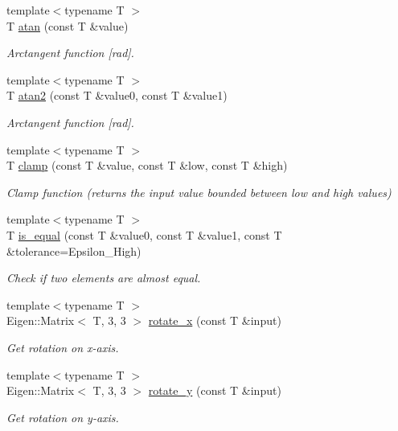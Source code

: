 \begin{DoxyCompactItemize}
{\footnotesize template$<$typename T $>$ }\\T \hyperlink{namespaceddd_a750f7cad6893bbbfbaa51353044bde4f}{atan} (const T \&value)
\begin{DoxyCompactList}\small\item\em Arctangent function \mbox{[}rad\mbox{]}. \end{DoxyCompactList}\item 
{\footnotesize template$<$typename T $>$ }\\T \hyperlink{namespaceddd_a1dea631509d981c3718796774b796d6c}{atan2} (const T \&value0, const T \&value1)
\begin{DoxyCompactList}\small\item\em Arctangent function \mbox{[}rad\mbox{]}. \end{DoxyCompactList}\item 
{\footnotesize template$<$typename T $>$ }\\T \hyperlink{namespaceddd_a070060e53a22cb16f07576bfb5c4b1cc}{clamp} (const T \&value, const T \&low, const T \&high)
\begin{DoxyCompactList}\small\item\em Clamp function (returns the input value bounded between low and high values) \end{DoxyCompactList}\item 
{\footnotesize template$<$typename T $>$ }\\T \hyperlink{namespaceddd_a7d68733d32a94776596a8e213ae9fcdf}{is\+\_\+equal} (const T \&value0, const T \&value1, const T \&tolerance=Epsilon\+\_\+\+High)
\begin{DoxyCompactList}\small\item\em Check if two elements are almost equal. \end{DoxyCompactList}\item 
{\footnotesize template$<$typename T $>$ }\\Eigen\+::\+Matrix$<$ T, 3, 3 $>$ \hyperlink{namespaceddd_ad45c0a592c1aebe03fc48a0c57d52641}{rotate\+\_\+x} (const T \&input)
\begin{DoxyCompactList}\small\item\em Get rotation on x-\/axis. \end{DoxyCompactList}\item 
{\footnotesize template$<$typename T $>$ }\\Eigen\+::\+Matrix$<$ T, 3, 3 $>$ \hyperlink{namespaceddd_a91c74ff16a602f1f611759e2e9f594f3}{rotate\+\_\+y} (const T \&input)
\begin{DoxyCompactList}\small\item\em Get rotation on y-\/axis. \end{DoxyCompactList}\item 

\end{DoxyCompactItemize}
